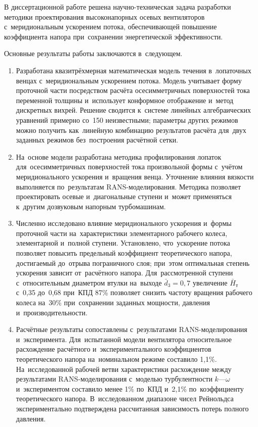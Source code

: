 
В диссертационной работе решена научно-техническая задача разработки методики проектирования высоконапорных осевых вентиляторов с~меридиональным ускорением потока, обеспечивающей повышение коэффициента напора при~сохранении энергетической эффективности.

Основные результаты работы заключаются в~следующем.

\begin{enumerate}
	\item Разработана квазитрёхмерная математическая модель течения в~лопаточных венцах с~меридиональным ускорением потока. Модель учитывает форму проточной части посредством расчёта осесимметричных поверхностей тока переменной толщины и~использует конформное отображение и~метод дискретных вихрей. Решение сводится к~системе линейных алгебраических уравнений примерно со~150 неизвестными; параметры других режимов можно получить как~линейную комбинацию результатов расчёта для~двух заданных режимов без~построения расчётной сетки.

	\item На~основе модели разработана методика профилирования лопаток для~осесимметричных поверхностей тока произвольной формы с~учётом меридионального ускорения и~вращения венца. Уточнение влияния вязкости выполняется по~результатам RANS-моделирования. Методика позволяет проектировать осевые и~диагональные ступени и~может применяться к~другим дозвуковым напорным турбомашинам.

	\item Численно исследовано влияние меридионального ускорения и~формы проточной части на~характеристики элементарного рабочего колеса, элементарной и~полной ступени. Установлено, что~ускорение потока позволяет повысить предельный коэффициент теоретического напора, достигаемый до~отрыва пограничного слоя; при~этом оптимальная степень ускорения зависит от~расчётного напора. Для~рассмотренной ступени с~относительным диаметром втулки на~выходе \(\bar{d}_3=0,7\) увеличение \(\bar{H}_\text{т}\) с~0,35 до~0,68 при~КПД 87\% позволяет снизить частоту вращения рабочего колеса на~30\% при~сохранении заданных мощности, давления и~производительности.

	\item Расчётные результаты сопоставлены с~результатами RANS-моделирования и~эксперимента. Для~испытанной модели вентилятора относительное расхождение расчётного и~экспериментального коэффициентов теоретического напора на~номинальном режиме составило 1,1\%. На~исследованной рабочей ветви характеристики расхождение между результатами RANS-моделирования с~моделью турбулентности \(k\text{---}\omega\) и~экспериментом составило менее 1\% по~КПД и~2,1\% по~коэффициенту теоретического напора. В~исследованном диапазоне чисел Рейнольдса экспериментально подтверждена рассчитанная зависимость потерь полного давления.


\end{enumerate}
